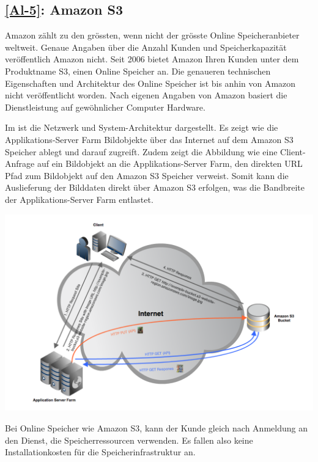 \subsection{\ref{Al-5}: Amazon S3}
Amazon zählt zu den grössten, wenn nicht der grösste Online Speicheranbieter weltweit. Genaue Angaben über die Anzahl Kunden und Speicherkapazität veröffentlich Amazon nicht. Seit 2006 bietet Amazon Ihren Kunden unter dem Produktname S3, einen Online Speicher an. Die genaueren technischen Eigenschaften und Architektur des Online Speicher ist bis anhin von Amazon nicht veröffentlicht worden. Nach eigenen Angaben von Amazon basiert die Dienstleistung auf gewöhnlicher Computer Hardware.

Im  ist die Netzwerk und System-Architektur dargestellt. Es zeigt wie die Applikations-Server Farm Bildobjekte über das Internet auf dem Amazon S3 Speicher ablegt und darauf zugreift. Zudem zeigt die Abbildung wie eine Client-Anfrage auf ein Bildobjekt an die Applikations-Server Farm, den direkten URL Pfad zum Bildobjekt auf den Amazon S3 Speicher verweist. Somit kann die Auslieferung der Bilddaten direkt über Amazon S3 erfolgen, was die Bandbreite der Applikations-Server Farm entlastet. 

\begin{center}
\includegraphics[width=\linewidth, keepaspectratio = true]{media/Amazon_S3.png}
\end{center}




Bei Online Speicher wie Amazon S3, kann der Kunde gleich nach Anmeldung an den Dienst, die Speicherressourcen verwenden. Es fallen also keine Installationkosten für die Speicherinfrastruktur an. 

